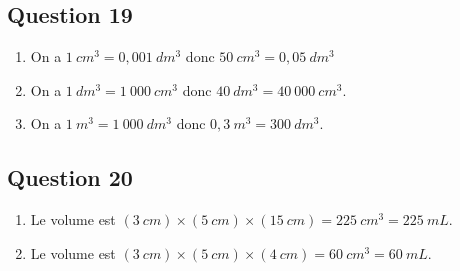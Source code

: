 \documentclass[12 pt]{extarticle}
\theoremstyle{plain}
\begin{document}
\subsection*{Question 19}
\begin{enumerate}
\item On a $1~cm^3 = 0, 001~dm^3$ donc $50~cm^3 = 0,05~dm^3$
\item On a $1~dm^3=1~000~cm^3$ donc $40~dm^3=40~000~cm^3$.
\item On a $1~m^3 = 1~000~dm^3$ donc $0,3~m^3 = 300~dm^3$.
\end{enumerate}
\subsection*{Question 20}
\begin{enumerate}
\item Le volume est $(3~cm)\times (5~cm)\times(15~cm) = 
225~cm^3 = 225~mL$.
\item Le volume est $(3~cm)\times (5~cm)\times(4~cm) = 
60~cm^3 = 60~mL$.
\end{enumerate}
 	
\end{document}
